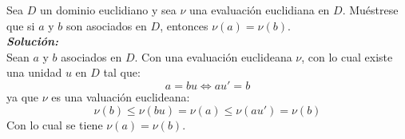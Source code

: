 Sea $D$ un dominio euclidiano y sea $\nu$ una evaluación euclidiana en $D$. Muéstrese que si $a$ y $b$ son asociados en $D$, entonces $\nu(a) = \nu(b)$.\\
    \textbf{\textit{Soluci\'on:}}\\
    Sean $a$ y $b$ asociados en $D$. Con una evaluaci\'on euclideana $\nu$, con lo cual existe una unidad $u$ en $D$ tal que:
    $$a=bu \iff au'=b$$
    ya que $\nu$ es una valuaci\'on euclideana: \\
    $$\nu(b)\leq\nu(bu)=\nu(a)\leq \nu(au')=\nu(b)$$
    Con lo cual se tiene $\nu(a)=\nu(b)$.